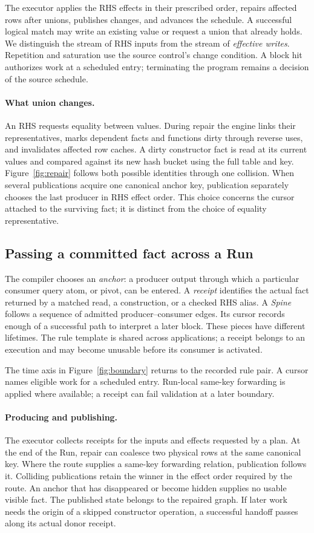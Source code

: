 \documentclass[10pt,letterpaper]{article}
\begin{document}
The executor applies the RHS effects in their prescribed order, repairs affected rows after unions, publishes changes, and advances the schedule. A successful logical match may write an existing value or request a union that already holds. We distinguish the stream of RHS inputs from the stream of \emph{effective writes}. Repetition and saturation use the source control's change condition. A block hit authorizes work at a scheduled entry; terminating the program remains a decision of the source schedule.

\paragraph{What union changes.}
An RHS requests equality between values. During repair the engine links their representatives, marks dependent facts and functions dirty through reverse uses, and invalidates affected row caches. A dirty constructor fact is read at its current values and compared against its new hash bucket using the full table and key. Figure~\ref{fig:repair} follows both possible identities through one collision. When several publications acquire one canonical anchor key, publication separately chooses the last producer in RHS effect order. This choice concerns the cursor attached to the surviving fact; it is distinct from the choice of equality representative.


\subsection{Passing a committed fact across a Run}
The compiler chooses an \emph{anchor}: a producer output through which a particular consumer query atom, or pivot, can be entered. A \emph{receipt} identifies the actual fact returned by a matched read, a construction, or a checked RHS alias. A \emph{Spine} follows a sequence of admitted producer--consumer edges. Its cursor records enough of a successful path to interpret a later block. These pieces have different lifetimes. The rule template is shared across applications; a receipt belongs to an execution and may become unusable before its consumer is activated.


The time axis in Figure~\ref{fig:boundary} returns to the recorded rule pair. A cursor names eligible work for a scheduled entry. Run-local same-key forwarding is applied where available; a receipt can fail validation at a later boundary.
\paragraph{Producing and publishing.}
The executor collects receipts for the inputs and effects requested by a plan. At the end of the Run, repair can coalesce two physical rows at the same canonical key. Where the route supplies a same-key forwarding relation, publication follows it. Colliding publications retain the winner in the effect order required by the route. An anchor that has disappeared or become hidden supplies no usable visible fact. The published state belongs to the repaired graph. If later work needs the origin of a skipped constructor operation, a successful handoff passes along its actual donor receipt.
\end{document}
